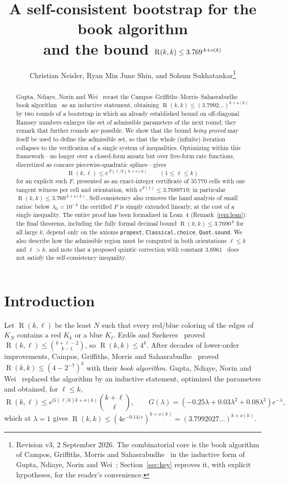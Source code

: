 \documentclass[11pt]{article}
\title{A self-consistent bootstrap for the book algorithm\\ and the bound $\Ram(k,k)\le 3.769^{\,k+o(k)}$}
\author{\normalsize Christian Neisler, Ryan Min June Shin, and Sohum Sukhatankar\thanks{Revision v3, 2 September 2026.  The combinatorial core is the book algorithm of Campos, Griffiths, Morris and Sahasrabudhe~\cite{CGMS} in the inductive form of Gupta, Ndiaye, Norin and Wei~\cite{GNNW}; Section~\ref{sec:key} reproves it, with explicit hypotheses, for the reader's convenience.}}
\date{}
\theoremstyle{definition}
\newcommand{\lam}{\lambda}
\DeclareMathOperator{\Ram}{R}
\begin{document}
\maketitle

\begin{abstract}
Gupta, Ndiaye, Norin and Wei~\cite{GNNW} recast the Campos--Griffiths--Morris--Sahasrabudhe book algorithm~\cite{CGMS} as an inductive statement, obtaining $\Ram(k,k)\le(3.7992\ldots)^{k+o(k)}$ by two rounds of a bootstrap in which an already established bound on off-diagonal Ramsey numbers enlarges the set of admissible parameters of the next round; they remark that further rounds are possible.  We show that the bound \emph{being proved} may itself be used to define the admissible set, so that the whole (infinite) iteration collapses to the verification of a single system of inequalities.  Optimizing within this framework---no longer over a closed-form ansatz but over free-form rate functions, discretized as concave piecewise-quadratic splines---gives
\[
\Ram(k,\ell)\le e^{\,F(\ell/k)\,k+o(k)}\qquad(1\le\ell\le k)
\]
for an explicit such $F$, presented as an exact-integer certificate of $35\,770$ cells with one tangent witness per cell and orientation, with $e^{F(1)}\le3.7689719$; in particular $\Ram(k,k)\le3.769^{\,k+o(k)}$.  Self-consistency also removes the hand analysis of small ratios: below $\lam_0=10^{-4}$ the certified $F$ is simply extended linearly, at the cost of a single inequality.  The entire proof has been formalized in Lean~4 (Remark~\ref{rem:lean}): the final theorems, including the fully formal decimal bound $\Ram(k,k)\le3.7690^{\,k}$ for all large $k$, depend only on the axioms \texttt{propext}, \texttt{Classical.choice}, \texttt{Quot.sound}.  We also describe how the admissible region must be computed in both orientations $\ell\le k$ and $\ell>k$, and note that a proposed quintic correction with constant $3.6961$~\cite{HM} does not satisfy the self-consistency inequality.
\end{abstract}

\section{Introduction}

Let $\Ram(k,\ell)$ be the least $N$ such that every red/blue coloring of the edges of $K_N$ contains a red $K_k$ or a blue $K_\ell$.  Erd\H{o}s and Szekeres~\cite{ES} proved $\Ram(k,\ell)\le\binom{k+\ell-2}{k-1}$, so $\Ram(k,k)\le4^k$.  After decades of lower-order improvements, Campos, Griffiths, Morris and Sahasrabudhe~\cite{CGMS} proved $\Ram(k,k)\le(4-2^{-7})^k$ with their \emph{book algorithm}.  Gupta, Ndiaye, Norin and Wei~\cite{GNNW} replaced the algorithm by an inductive statement, optimized the parameters and obtained, for $\ell\le k$,
\begin{equation}\label{eq:gnnw}
\Ram(k,\ell)\le e^{G(\ell/k)k+o(k)}\binom{k+\ell}{\ell},\qquad G(\lam)=(-0.25\lam+0.03\lam^2+0.08\lam^3)e^{-\lam},
\end{equation}
which at $\lam=1$ gives $\Ram(k,k)\le(4e^{-0.14/e})^{k+o(k)}=(3.7992027\ldots)^{k+o(k)}$.
\end{document}
